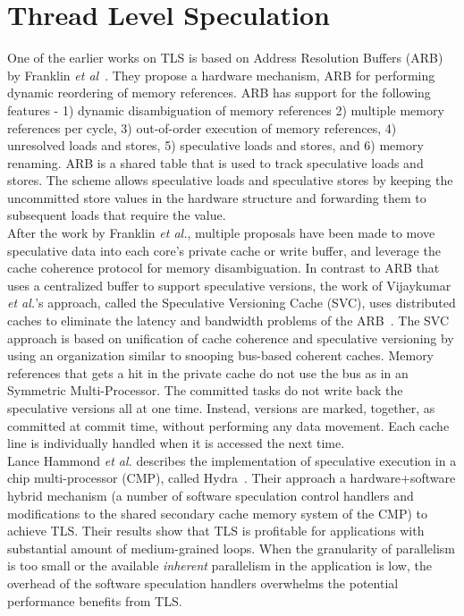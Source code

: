 \documentclass[10pt]{report}          %
\begin{document}
\section{Thread Level Speculation}

One of the earlier works on TLS is based on Address Resolution Buffers (ARB) by Franklin \textit{et al}~\cite{ARB}.  They propose a hardware mechanism, ARB for performing dynamic reordering of memory references.  ARB has support for the following features - 1) dynamic disambiguation of memory references 2) multiple memory
references per cycle, 3) out-of-order execution of memory references, 4) unresolved loads and stores, 5) speculative loads and stores, and 6) memory renaming. ARB is a shared table that is used to track speculative loads and stores.  The scheme allows speculative loads and speculative stores by keeping the uncommitted store values in the hardware structure and forwarding them to subsequent loads that require the value.\\
After the work by Franklin \textit{et al.}, multiple proposals have been made to move speculative data into each core’s private cache or write buffer, and leverage the cache coherence protocol for memory disambiguation.   In contrast to ARB that uses a centralized buffer to support speculative versions, the work of Vijaykumar \textit{et al.}'s approach, called the Speculative Versioning Cache (SVC), uses distributed caches to eliminate the latency and bandwidth problems of the ARB~\cite{Gopal}. The SVC approach is based on unification of cache coherence and speculative versioning by using an organization similar to snooping bus-based coherent caches. Memory references that gets a hit in the private cache do not use the bus as in an Symmetric Multi-Processor. The committed tasks do not write back the speculative versions all at one time. Instead, versions are marked, together, as committed at commit time, without performing any data movement. Each cache line is individually handled when it is accessed the next time.\\
Lance Hammond \textit{et al.} describes the implementation of speculative execution in a chip multi-processor (CMP), called Hydra~\cite{Hydra}. Their approach a hardware+software hybrid mechanism (a number of software speculation control handlers and modifications to the shared secondary cache memory system of the CMP) to achieve TLS. Their results show that TLS is profitable for applications with substantial amount of medium-grained loops.  When the granularity of parallelism is too small or the available \textit{inherent} parallelism in the application is low, the overhead of the software speculation handlers overwhelms the potential performance benefits from TLS.\\
\end{document}
